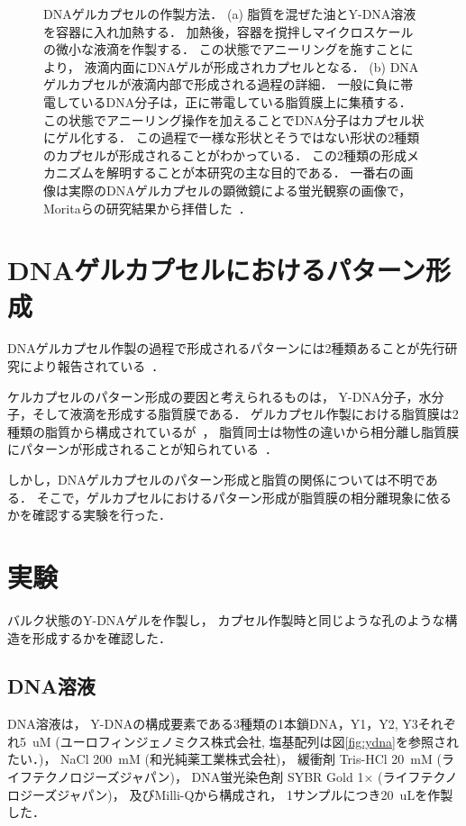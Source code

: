 \begin{figure}
\centering

\caption{DNAゲルカプセルの作製方法．
    (a) 脂質を混ぜた油とY-DNA溶液を容器に入れ加熱する．
        加熱後，容器を撹拌しマイクロスケールの微小な液滴を作製する．
        この状態でアニーリングを施すことにより，
        液滴内面にDNAゲルが形成されカプセルとなる．
    (b) DNAゲルカプセルが液滴内部で形成される過程の詳細．
        一般に負に帯電しているDNA分子は，正に帯電している脂質膜上に集積する．
        この状態でアニーリング操作を加えることでDNA分子はカプセル状にゲル化する．
        この過程で一様な形状とそうではない形状の2種類のカプセルが形成されることがわかっている．
        この2種類の形成メカニズムを解明することが本研究の主な目的である．
        一番右の画像は実際のDNAゲルカプセルの顕微鏡による蛍光観察の画像で，
        Moritaらの研究結果から拝借した~\cite{morita2017formation}．
}

\label{fig:capsule}
\end{figure}


\section{DNAゲルカプセルにおけるパターン形成}

DNAゲルカプセル作製の過程で形成されるパターンには2種類あることが先行研究により報告されている~\cite{morita2017formation}．

ケルカプセルのパターン形成の要因と考えられるものは，
Y-DNA分子，水分子，そして液滴を形成する脂質膜である．
ゲルカプセル作製における脂質膜は2種類の脂質から構成されているが~\cite{morita2017formation}，
脂質同士は物性の違いから相分離し脂質膜にパターンが形成されることが知られている~\cite{yanagisawa2014multiple}．

しかし，DNAゲルカプセルのパターン形成と脂質の関係については不明である．
そこで，ゲルカプセルにおけるパターン形成が脂質膜の相分離現象に依るかを確認する実験を行った．

\section{実験}
バルク状態のY-DNAゲルを作製し，
カプセル作製時と同じような孔のような構造を形成するかを確認した．

\subsection{DNA溶液}
DNA溶液は，
Y-DNAの構成要素である3種類の1本鎖DNA，Y1，Y2, Y3それぞれ\SI{5}{uM} (ユーロフィンジェノミクス株式会社, 塩基配列は図\ref{fig:ydna}を参照されたい．)，
NaCl \SI{200}{mM} (和光純薬工業株式会社)，
緩衝剤 Tris-HCl \SI{20}{mM} (ライフテクノロジーズジャパン)，
DNA蛍光染色剤 SYBR Gold 1× (ライフテクノロジーズジャパン)，
及びMilli-Qから構成され，
1サンプルにつき\SI{20}{uL}を作製した．

